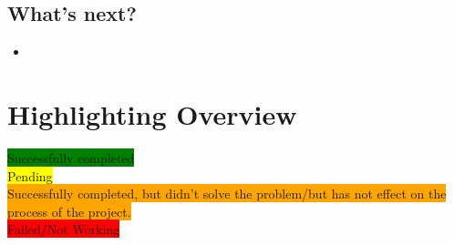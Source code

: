 \documentclass{article}
\begin{document}
\subsection{What's next?}
\begin{itemize}
\item
\end{itemize}
\newpage
\fi

\section{Highlighting Overview}

\colorbox{green}{Successfully completed}\\
\colorbox{yellow}{Pending}\\
\colorbox{orange}{Successfully completed, but didn't solve the problem/but has not effect on the process of the project.}\\
\colorbox{red}{Failed/Not Working}\\
\newpage





\end{document}
